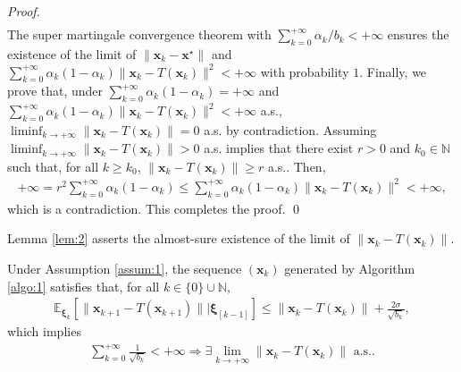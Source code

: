 \documentclass[smallextended,referee,envcountsect,]{svjour3}
\begin{document}
\begin{proof}
\begin{align*}
\end{align*}
The super martingale convergence theorem \cite[Proposition 8.2.10]{bert} with $\sum_{k=0}^{+ \infty} \alpha_k/b_k < + \infty$ ensures the existence of the limit of $\|\bm{x}_k - \bm{x}^\star \|$ and $\sum_{k=0}^{+\infty} \alpha_k (1 - \alpha_k) \| \bm{x}_k - T (\bm{x}_{k})\|^2 < + \infty$ with probability $1$. Finally, we prove that, under $\sum_{k=0}^{+\infty} \alpha_k (1 - \alpha_k) = + \infty$ and $\sum_{k=0}^{+\infty} \alpha_k (1 - \alpha_k) \| \bm{x}_k - T (\bm{x}_{k})\|^2 < + \infty$ a.s., $\liminf_{k \to + \infty} \|\bm{x}_k - T (\bm{x}_k)\| = 0$ a.s. by contradiction. Assuming $\liminf_{k \to + \infty} \|\bm{x}_k - T (\bm{x}_k)\| > 0$ a.s. implies that there exist $r > 0$ and $k_0 \in \mathbb{N}$ such that, for all $k \geq k_0$, $\|\bm{x}_k - T (\bm{x}_k)\| \geq r$ a.s.. Then, 
\begin{align*}
+ \infty 
= 
r^2 \sum_{k=0}^{+\infty} \alpha_k (1 - \alpha_k)
\leq
\sum_{k=0}^{+\infty} \alpha_k (1 - \alpha_k) \| \bm{x}_k - T (\bm{x}_{k})\|^2
< + \infty,
\end{align*}
which is a contradiction. This completes the proof.
\qed
\end{proof}

Lemma \ref{lem:2} asserts the almost-sure existence of the limit of $\|\bm{x}_k - T(\bm{x}_k)\|$.

\begin{lemma}\label{lem:2}
Under Assumption \ref{assum:1}, the sequence $(\bm{x}_k)$ generated by Algorithm \ref{algo:1} satisfies that, for all $k \in \{0\} \cup \mathbb{N}$,
\begin{align*}
\mathbb{E}_{\bm{\xi}_k} \left[ \| \bm{x}_{k+1} - T (\bm{x}_{k+1}) \| \big| \bm{\xi}_{[k-1]} \right]
\leq
\| \bm{x}_{k} - T (\bm{x}_{k}) \|
+ 
\frac{2 \sigma}{\sqrt{b_k}},
\end{align*} 
which implies 
\begin{align*}
\sum_{k=0}^{+ \infty} \frac{1}{\sqrt{b_k}} < + \infty
\Rightarrow
\exists \lim_{k \to + \infty} \| \bm{x}_k - T(\bm{x}_k)\| \text{ a.s.}.
\end{align*}
\end{lemma}
\end{document}
